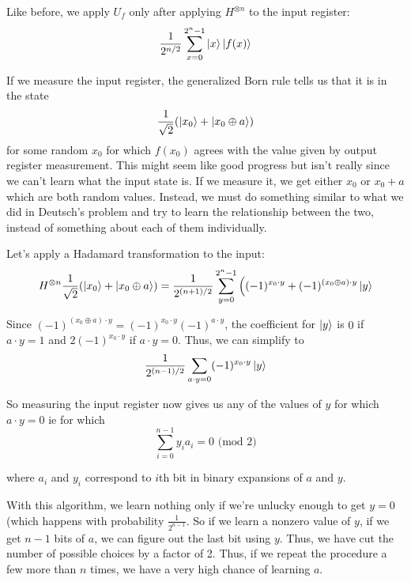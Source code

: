 \documentclass[letterpaper]{article}
\begin{document}
Like before, we apply $U_{f}$ only after applying $H^{\otimes n}$ to the input register: 
$$\frac{1}{2^{n/2}} \sum_{x = 0}^{2^{n} - 1} \ket{x} \ket{f(x)} $$

If we measure the input register, the generalized Born rule tells us that it is in the state 
$$ \frac{1}{\sqrt{2}} (\ket{x_{0}} + \ket{x_{0} \oplus a}) $$ for some random $x_{0}$ for which $f(x_{0})$ agrees with the value given by output register measurement. This might seem like good progress but isn't really since we can't learn what the input state is. If we measure it, we get either $x_{0}$ or $x_{0} + a$ which are both random values. Instead, we must do something similar to what we did in Deutsch's problem and try to learn the relationship between the two, instead of something about each of them individually. 

Let's apply a Hadamard transformation to the input:
$$ H^{\otimes n} \frac{1}{\sqrt{2}} (\ket{x_{0}} + \ket{x_{0} \oplus a}) = \frac{1}{2^{(n+1) / 2}} \sum_{y = 0}^{2^{n} - 1} \Big( (-1)^{x_{0} \cdot y} + (-1)^{(x_{0} \oplus a) \cdot y} \ket{y} $$

Since $(-1)^{(x_{0} \oplus a) \cdot y} = (-1)^{x_{0} \cdot y} (-1)^{a \cdot y}$, the coefficient for $\ket{y}$ is $0$ if $a \cdot y = 1$ and $2 (-1)^{x_{0} \cdot y}$ if $a \cdot y = 0$. Thus, we can simplify to
$$ \frac{1}{2^{(n-1)/2}} \sum_{a \cdot y = 0} (-1)^{x_{0} \cdot y} \ket{y} $$

So measuring the input register now gives us any of the values of $y$ for which $a \cdot y = 0$ ie for which 
$$\sum_{i = 0}^{n - 1} y_{i} a_{i}= 0 \text{ (mod 2)} $$

where $a_{i}$ and $y_{i}$ correspond to $i$th bit in binary expansions of $a$ and $y$. 

With this algorithm, we learn nothing only if we're unlucky enough to get $y = 0$ (which happens with probability $\frac{1}{2^{n-1}}$. So if we learn a nonzero value of $y$, if we get $n-1$ bits of $a$, we can figure out the last bit using $y$. Thus, we have cut the number of possible choices by a factor of 2. Thus, if we repeat the procedure a few more than $n$ times, we have a very high chance of learning $a$. 
\end{document}
